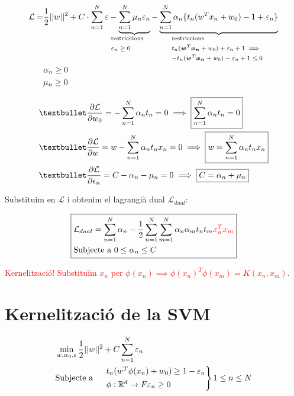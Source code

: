 \begin{align*}
	\mathcal{L} =& \frac{1}{2} ||w||^2  + C \cdot \sum_{n=1}^N \varepsilon - 
	\underbrace{\sum_{n=1}^N \mu_n \varepsilon_n}_{
		\mathclap{\text{\parbox{2cm}{restriccions \\ $\varepsilon_n \ge 0$}}}} 
	-\underbrace{\sum_{n=1}^N \alpha_n \{ t_n (w^T x_n + w_0) - 1 + \varepsilon_n \}}_{\mathclap{
		\text{\parbox{4cm}{restriccions \\ 
				$t_n (\bmath{w}^T \bmath{x_n} + w_0) + \varepsilon_n + 1 \implies$ \\
				$-t_n (\bmath{w}^T \bmath{x_n} + w_0) - \varepsilon_n + 1 \le 0 $ }}
	}} 
	\\
	& \alpha_n \ge 0 \\
	& \mu_n \ge 0
\end{align*}

\begin{align*}
	& \textbullet \frac{\partial \mathcal{L}}{\partial w_0} = - \sum_{n=1}^N \alpha_n t_n = 0 \implies \boxed{\sum_{n=1}^N \alpha_n t_n = 0} \\
	& \textbullet \frac{\partial \mathcal{L}}{\partial w} = w - \sum_{n=1}^N \alpha_n t_n x_n = 0 \implies \boxed{w = \sum_{n=1}^N \alpha_n t_n x_n} \\
	& \textbullet \frac{\partial \mathcal{L}}{\partial \epsilon_n} = C - \alpha_n - \mu_n = 0  \implies \boxed{C= \alpha_n + \mu_n}
\end{align*}
	
Substituim en $\mathcal{L}$ i obtenim el lagrangià dual $\mathcal{L}_{dual}$:

$$
\boxed{
\begin{aligned}
	&\mathcal{L}_{dual} = \sum_{n=1}^N \alpha_n - 
	\frac{1}{2} \sum_{n=1}^N \sum_{m=1}^N \alpha_n \alpha_m t_n t_m \textcolor{red}{x_n^T x_m} \\
	&\text{Subjecte a } 0 \le \alpha_n \le C
\end{aligned}
}
$$

\textcolor{red}{Kernelització! Substituïm $x_n$ per $\phi (x_n) \implies \phi(x_n)^T \phi(x_m) = K(x_n, x_m)$.}


\section{Kernelització de la SVM}

\begin{align*}
	& \min_{w, w_0, \varepsilon} \frac{1}{2} ||w||^2 + C \sum_{n=1}^N \varepsilon_n \\
	& \text{Subjecte a }
	\begin{rcases}
		& t_n (w^T \phi (x_n) + w_0) \ge 1 - \varepsilon_n \\
		& \phi: \mathbb{R}^d \to F \varepsilon_n \ge 0
	\end{rcases}
	1 \le n \le N
\end{align*}

